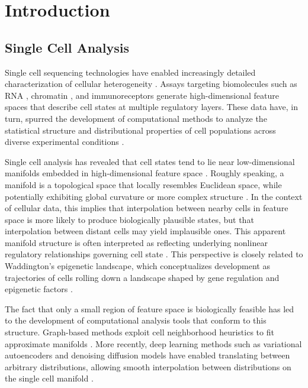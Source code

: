 \chapter{Introduction}

\section{Single Cell Analysis}

Single cell sequencing technologies have enabled increasingly detailed characterization of cellular heterogeneity \citep{tangMRNASeqWholetranscriptomeAnalysis2009, ginhouxSinglecellImmunologyPresent2022}. Assays targeting biomolecules such as RNA \citep{buettnerComputationalAnalysisCelltocell2015}, chromatin \citep{lakeIntegrativeSinglecellAnalysis2018}, and immunoreceptors \citep{wangIntegratingSinglecellRNA2025} generate high-dimensional feature spaces that describe cell states at multiple regulatory layers. These data have, in turn, spurred the development of computational methods to analyze the statistical structure and distributional properties of cell populations across diverse experimental conditions \citep{lueckenCurrentBestPractices2019, conesaSurveyBestPractices2016, heumosBestPracticesSinglecell2023, loveModeratedEstimationFold2014}.

Single cell analysis has revealed that cell states tend to lie near low-dimensional manifolds embedded in high-dimensional feature space \citep{moonManifoldLearningbasedMethods2018, mcinnesUMAPUniformManifold2018}. Roughly speaking, a manifold is a topological space that locally resembles Euclidean space, while potentially exhibiting global curvature or more complex structure \citep{tuIntroductionManifolds2011}. In the context of cellular data, this implies that interpolation between nearby cells in feature space is more likely to produce biologically plausible states, but that interpolation between distant cells may yield implausible ones. This apparent manifold structure is often interpreted as reflecting underlying nonlinear regulatory relationships governing cell state \citep{huguetManifoldInterpolatingOptimalTransport2022}. This perspective is closely related to Waddington's epigenetic landscape, which conceptualizes development as trajectories of cells rolling down a landscape shaped by gene regulation and epigenetic factors \citep{waddingtonStrategyGenes2014}.

The fact that only a small region of feature space is biologically feasible has led to the development of computational analysis tools that conform to this structure. Graph-based methods exploit cell neighborhood heuristics to fit approximate manifolds \citep{moonVisualizingStructureTransitions2019, dijkMAGICDiffusionbasedImputation2017, dijkRecoveringGeneInteractions2018}. More recently, deep learning methods such as variational autoencoders \citep{lopezDeepGenerativeModeling2018, xuProbabilisticHarmonizationAnnotation2021} and denoising diffusion \citep{luoScDiffusionConditionalGeneration2024} models have enabled translating between arbitrary distributions, allowing smooth interpolation between distributions on the single cell manifold \citep{lotfollahiScGenPredictsSinglecell2019, kleinCellFlowEnablesGenerative2025}.

